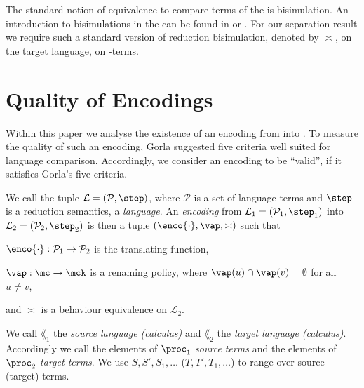 \documentclass[final,copyright,creativecommons]{eptcs}
\begin{document}
The standard notion of equivalence to compare terms of the \piCal is bisimulation. An introduction to bisimulations in the \piCal can be found \eg in \cite{milnerParrowWalker92} or \cite{sang}. For our separation result we require such a standard version of reduction bisimulation, denoted by $ \asymp $, on the target language, \ie on \piNM-terms.



\section{Quality of Encodings}
\label{sec:quality}

Within this paper we analyse the existence of an encoding from \piT into \piNM. To measure the quality of such an encoding, Gorla \cite{gorla} suggested five criteria well suited for language comparison. Accordingly, we consider an encoding to be ``valid'', if it satisfies Gorla's five criteria.

We call the tuple $ \mathcal{L} = \left( \mathcal{P}, \step \right) $, where $ \mathcal{P} $ is a set of language terms and $ \step $ is a reduction semantics, a \emph{language}.
An \emph{encoding} from $ \mathcal{L}_1 = \left( \mathcal{P}_1, \step_1 \right) $ into $ \mathcal{L}_2 = \left( \mathcal{P}_2, \step_2 \right) $ is then a tuple $(\enco{\cdot}, \vap, \asymp )$ such that
\begin{compactitem}
	\item $ \enco{\cdot} : \mathcal{P}_1 \rightarrow \mathcal{P}_2 $ is the translating function,
	\item $ \vap : \mc \rightarrow \mck $ is a renaming policy, where $ \vap(u) \cap \vap(v) = \emptyset$ for all $ u \neq v $,
	\item and $ \asymp $ is a behaviour equivalence on $ \mathcal{L}_2 $.
\end{compactitem}
We call $ \lang_1 $ the \emph{source language (calculus)} and $ \lang_2 $ the \emph{target language (calculus)}. Accordingly we call the elements of $ \proc_1 $ \emph{source terms} and the elements of $ \proc_2 $ \emph{target terms}.
We use $ S, S', S_1, \ldots $ ($ T, T', T_1, \ldots $) to range over source (target) terms.
\end{document}
